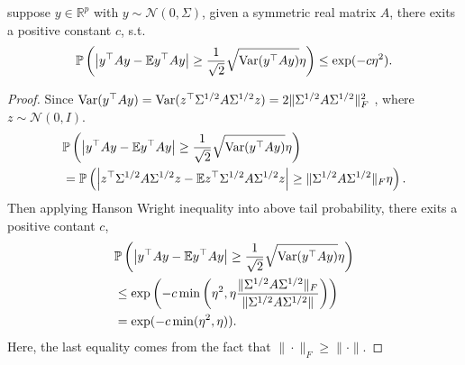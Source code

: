 \begin{lem}
\label{lemma: variant_hanson_wright}
suppose $y\in \mathbb{R}^p$ with $y\sim \mathcal{N}(0, \Sigma)$, given a symmetric real matrix $A$, there exits a positive constant $c$, s.t. 
\begin{equation}
\mathbb{P}\left(\left|y^\top A y - \mathbb{E} y^\top A y\right|\ge \frac{1}{\sqrt{2}}\sqrt{\mbox{Var}(y^\top A y)}\eta \right)\le \exp(-c\eta^2).
\end{equation}
\begin{proof}
Since $\mbox{Var}(y^\top A y) = \mbox{Var}(z^\top\Sigma^{1/2}A\Sigma^{1/2}z) = 2\|\Sigma^{1/2}A\Sigma^{1/2}\|_F^2$ \citep{rencher2008linear}, where $z\sim \mathcal{N}(0, I)$. 
\begin{equation}
\begin{aligned}
&\mathbb{P}\left(\left|y^\top A y - \mathbb{E} y^\top A y\right|\ge \frac{1}{\sqrt{2}}\sqrt{\mbox{Var}(y^\top A y)}\eta \right)\\
&= \mathbb{P}\left(\left|z^\top \Sigma^{1/2}A\Sigma^{1/2} z - \mathbb{E} z^\top \Sigma^{1/2}A\Sigma^{1/2} z\right|\ge \|\Sigma^{1/2}A\Sigma^{1/2}\|_F \eta \right). 
\end{aligned}
\end{equation}
Then applying Hanson Wright inequality \citep{rudelson2013hanson} into above tail probability, there exits a positive contant $c$,
\begin{equation}
\begin{aligned}
&\mathbb{P}\left(\left|y^\top A y - \mathbb{E} y^\top A y\right|\ge \frac{1}{\sqrt{2}}\sqrt{\mbox{Var}(y^\top A y)}\eta \right)\\
& \le \exp\left(-c \min \left(\eta^2, \eta \frac{\|\Sigma^{1/2}A\Sigma^{1/2}\|_F}{\|\Sigma^{1/2}A\Sigma^{1/2}\|}\right)\right)\\
& = \exp(-c\min(\eta^2, \eta)).
\end{aligned}
\end{equation}
Here, the last equality comes from the fact that $\|\cdot\|_F\ge \|\cdot\|$. 
\end{proof}
\end{lem}

